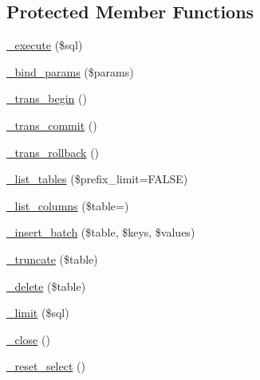 \subsection*{Protected Member Functions}
\begin{DoxyCompactItemize}
\item 
\mbox{\hyperlink{class_c_i___d_b__oci8__driver_ab53da6f3156300112ccfe328f30102f7}{\+\_\+execute}} (\$sql)
\item 
\mbox{\hyperlink{class_c_i___d_b__oci8__driver_adace0321549203c81958522ab1d88828}{\+\_\+bind\+\_\+params}} (\$params)
\item 
\mbox{\hyperlink{class_c_i___d_b__oci8__driver_addfcc8f1875daf14816362e22c98704c}{\+\_\+trans\+\_\+begin}} ()
\item 
\mbox{\hyperlink{class_c_i___d_b__oci8__driver_af42d25b8861d9fdde97dc11359c48218}{\+\_\+trans\+\_\+commit}} ()
\item 
\mbox{\hyperlink{class_c_i___d_b__oci8__driver_a432342278202fd1809f42277f6fe903f}{\+\_\+trans\+\_\+rollback}} ()
\item 
\mbox{\hyperlink{class_c_i___d_b__oci8__driver_a8736321498ba731f7fe0624c927362ad}{\+\_\+list\+\_\+tables}} (\$prefix\+\_\+limit=F\+A\+L\+SE)
\item 
\mbox{\hyperlink{class_c_i___d_b__oci8__driver_a52b8f333a8f3811ed2ed1011174160d0}{\+\_\+list\+\_\+columns}} (\$table=\textquotesingle{}\textquotesingle{})
\item 
\mbox{\hyperlink{class_c_i___d_b__oci8__driver_ad069b5095cab115e34e0b3ca6fd7c443}{\+\_\+insert\+\_\+batch}} (\$table, \$keys, \$values)
\item 
\mbox{\hyperlink{class_c_i___d_b__oci8__driver_acb8f6653fb55b7cf89a6ceb01aebdb6c}{\+\_\+truncate}} (\$table)
\item 
\mbox{\hyperlink{class_c_i___d_b__oci8__driver_aed6e27750068eb2c38120fa503c310de}{\+\_\+delete}} (\$table)
\item 
\mbox{\hyperlink{class_c_i___d_b__oci8__driver_a42e5c7f4e497a51123e7c2bceaef4e7f}{\+\_\+limit}} (\$sql)
\item 
\mbox{\hyperlink{class_c_i___d_b__oci8__driver_adeb12409f05b79a4634151ec07eb61cf}{\+\_\+close}} ()
\item 
\mbox{\hyperlink{class_c_i___d_b__oci8__driver_a242b3f0766b9d4ad759c14c7cd43e72a}{\+\_\+reset\+\_\+select}} ()
\end{DoxyCompactItemize}
